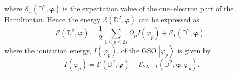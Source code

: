 \documentclass[aps,preprint]{revtex4}%
\begin{document}
where $\mathcal{E}_{1}\left(  \mathbb{D}^{2},\bm{\varphi}\right)  $ is the
expectation value of the one--electron part of the Hamiltonian. Hence the
energy $\mathcal{E}\left(  \mathbb{D}^{2},\bm{\varphi}\right)  $ can be
expressed as
\begin{equation}
\mathcal{E}\left(  \mathbb{D}^{2},\bm{\varphi}\right)  =\frac{1}{2}\sum_{1\leq
p\leq2s}\Omega_{p}I\left(  \varphi_{p}\right)  +\mathcal{E}_{1}\left(
\mathbb{D}^{2},\bm{\varphi}\right)  , \label{TEexpec}%
\end{equation}
where the ionization energy, $I\left(  \varphi_{p}\right)  $, of the GSO
$\left\vert \varphi_{p}\right\rangle $ is given by
\begin{equation}
I\left(  \varphi_{p}\right)  =\mathcal{E}\left(  \mathbb{D}^{2}%
,\bm{\varphi}\right)  -\mathcal{E}_{2N-1}\left(  \mathbb{D}^{2}%
,\bm{\varphi},\varphi_{p}\right)  .
\end{equation}
\end{document}
